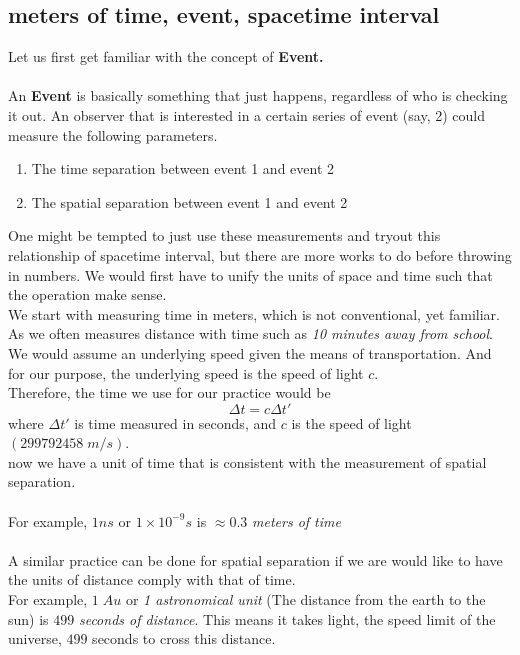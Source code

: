 \documentclass[12pt]{book}
\begin{document}
\subsection{meters of time, event, spacetime interval}
Let us first get familiar with the concept of \textbf{Event.}\\\\
An \textbf{Event} is basically something that just happens, regardless of who is checking it out. An observer that is interested in a certain series of event (say, 2) could measure the following parameters. 
\begin{enumerate}
    \item The time separation between event 1 and event 2
    \item The spatial separation between event 1 and event 2
\end{enumerate}
One might be tempted to just use these measurements and tryout this relationship of spacetime interval, but there are more works to do before throwing in numbers. We would first have to unify the units of space and time such that the operation make sense.\\
\newline
We start with measuring time in meters, which is not conventional, yet familiar. As we often measures distance with time such as \textit{10 minutes away from school}. We would assume an underlying speed given the means of transportation. And for our purpose, the underlying speed is the speed of light $c$.\\
Therefore, the time we use for our practice would be 
\[
\Delta t = c\Delta t' 
\]
where $\Delta t'$ is time measured in seconds, and $c$ is the speed of light $(299792458\;m/s)$.\\
now we have a unit of time that is consistent with the measurement of spatial separation.\\
\\For example, $1ns$ or $1\times 10^{-9}s$ is $\approx 0.3$ \textit{meters of time}\\
\\A similar practice can be done for spatial separation if we are would like to have the units of distance comply with that of time.\\
\newline
For example, $1\; Au$ or \textit{1 astronomical unit} (The distance from the earth to the sun) is $499$ \textit{seconds of distance}. This means it takes light, the speed limit of the universe, $499$ seconds to cross this distance. 
\\
\end{document}
